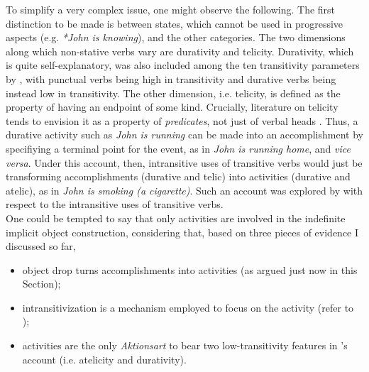 To simplify a very complex issue, one might observe the following. The first distinction to be made is between states, which cannot be used in progressive aspects (e.g. \textit{*John is knowing}), and the other categories. The two dimensions along which non-stative verbs vary are durativity and telicity. Durativity, which is quite self-explanatory, was also included among the ten transitivity parameters by \textcite{HopperThompson1980}, with punctual verbs being high in transitivity and durative verbs being instead low in transitivity. The other dimension, i.e. telicity, is defined as the property of having an endpoint of some kind. Crucially, literature on telicity tends to envision it as a property of \textit{predicates}, not just of verbal heads \parencite[270]{HopperThompson1980}. Thus, a durative activity such as \textit{John is running} can be made into an accomplishment by specifiying a terminal point for the event, as in \textit{John is running home}, and \textit{vice versa}. Under this account, then, intransitive uses of transitive verbs would just be transforming accomplishments (durative and telic) into activities (durative and atelic), as in \textit{John is smoking (a cigarette)}. Such an account was explored by \textcite{Mittwoch1982} with respect to the intransitive uses of transitive verbs.\\ %
One could be tempted to say that only activities are involved in the indefinite implicit object construction, considering that, based on three pieces of evidence I discussed so far,
\begin{itemize}
    \item object drop turns accomplishments into activities (as argued just now in this Section);
    \item intransitivization is a mechanism employed to focus on the activity (refer to );
    \item activities are the only \textit{Aktionsart} to bear two low-transitivity features in \textcite{HopperThompson1980}'s account (i.e. atelicity and durativity).
\end{itemize}
